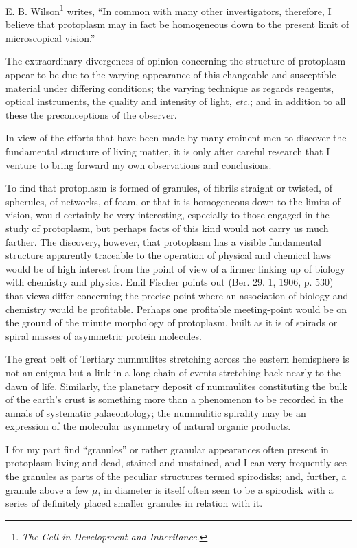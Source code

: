 \documentclass[a4paper, 12pt, oneside]{article}
\begin{document}
E. B. Wilson\footnote{\emph{The Cell in Development and Inheritance}.} writes, ``In common with many other investigators, therefore, I believe that protoplasm may in fact be homogeneous down to the present limit of microscopical vision.''

The extraordinary divergences of opinion concerning the structure of protoplasm appear to be due to the varying appearance of this changeable and susceptible material under differing conditions; the varying technique as regards reagents, optical instruments, the quality and intensity of light, \emph{etc.}; and in addition to all these the preconceptions of the observer.

In view of the efforts that have been made by many eminent men to discover the fundamental structure of living matter, it is only after careful research that I venture to bring forward my own observations and conclusions.

To find that protoplasm is formed of granules, of fibrils straight or twisted, of spherules, of networks, of foam, or that it is homogeneous down to the limits of vision, would certainly be very interesting, especially to those engaged in the study of protoplasm, but perhaps facts of this kind would not carry us much farther. The discovery, however, that protoplasm has a visible fundamental structure apparently traceable to the operation of physical and chemical laws would be of high interest from the point of view of a firmer linking up of biology with chemistry and physics. Emil Fischer points out (Ber. 29. 1, 1906, p. 530) that views differ concerning the precise point where an association of biology and chemistry would be profitable. Perhaps one profitable meeting-point would be on the ground of the minute morphology of protoplasm, built as it is of spirads or spiral masses of asymmetric protein molecules.

The great belt of Tertiary nummulites stretching across the eastern hemisphere is not an enigma but a link in a long chain of events stretching back nearly to the dawn of life. Similarly, the planetary deposit of nummulites constituting the bulk of the earth's crust is something more than a phenomenon to be recorded in the annals of systematic palaeontology; the nummulitic spirality may be an expression of the molecular asymmetry of natural organic products.

I for my part find ``granules'' or rather granular appearances often present in protoplasm living and dead, stained and unstained, and I can very frequently see the granules as parts of the peculiar structures termed spirodisks; and, further, a granule above a few $\mu$, in diameter is itself often seen to be a spirodisk with a series of definitely placed smaller granules in relation with it.
\end{document}
